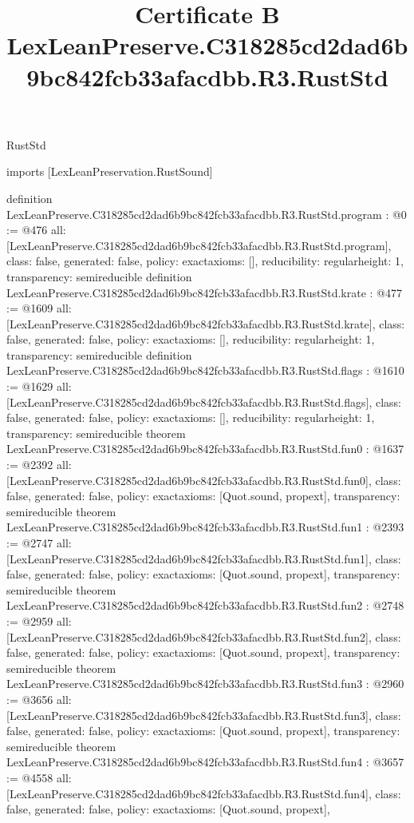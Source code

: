 \begin{lexlean}{RustStd}
\title{Certificate B LexLeanPreserve.C318285cd2dad6b9bc842fcb33afacdbb.R3.RustStd}
\begin{coremodule}
imports [LexLeanPreservation.RustSound]

definition LexLeanPreserve.C318285cd2dad6b9bc842fcb33afacdbb.R3.RustStd.program : @0 := @476 {
  all: [LexLeanPreserve.C318285cd2dad6b9bc842fcb33afacdbb.R3.RustStd.program],
  class: false,
  generated: false,
  policy: exact{axioms: []},
  reducibility: regular{height: 1},
  transparency: semireducible
}
definition LexLeanPreserve.C318285cd2dad6b9bc842fcb33afacdbb.R3.RustStd.krate : @477 := @1609 {
  all: [LexLeanPreserve.C318285cd2dad6b9bc842fcb33afacdbb.R3.RustStd.krate],
  class: false,
  generated: false,
  policy: exact{axioms: []},
  reducibility: regular{height: 1},
  transparency: semireducible
}
definition LexLeanPreserve.C318285cd2dad6b9bc842fcb33afacdbb.R3.RustStd.flags : @1610 := @1629 {
  all: [LexLeanPreserve.C318285cd2dad6b9bc842fcb33afacdbb.R3.RustStd.flags],
  class: false,
  generated: false,
  policy: exact{axioms: []},
  reducibility: regular{height: 1},
  transparency: semireducible
}
theorem LexLeanPreserve.C318285cd2dad6b9bc842fcb33afacdbb.R3.RustStd.fun0 : @1637 := @2392 {
  all: [LexLeanPreserve.C318285cd2dad6b9bc842fcb33afacdbb.R3.RustStd.fun0],
  class: false,
  generated: false,
  policy: exact{axioms: [Quot.sound, propext]},
  transparency: semireducible
}
theorem LexLeanPreserve.C318285cd2dad6b9bc842fcb33afacdbb.R3.RustStd.fun1 : @2393 := @2747 {
  all: [LexLeanPreserve.C318285cd2dad6b9bc842fcb33afacdbb.R3.RustStd.fun1],
  class: false,
  generated: false,
  policy: exact{axioms: [Quot.sound, propext]},
  transparency: semireducible
}
theorem LexLeanPreserve.C318285cd2dad6b9bc842fcb33afacdbb.R3.RustStd.fun2 : @2748 := @2959 {
  all: [LexLeanPreserve.C318285cd2dad6b9bc842fcb33afacdbb.R3.RustStd.fun2],
  class: false,
  generated: false,
  policy: exact{axioms: [Quot.sound, propext]},
  transparency: semireducible
}
theorem LexLeanPreserve.C318285cd2dad6b9bc842fcb33afacdbb.R3.RustStd.fun3 : @2960 := @3656 {
  all: [LexLeanPreserve.C318285cd2dad6b9bc842fcb33afacdbb.R3.RustStd.fun3],
  class: false,
  generated: false,
  policy: exact{axioms: [Quot.sound, propext]},
  transparency: semireducible
}
theorem LexLeanPreserve.C318285cd2dad6b9bc842fcb33afacdbb.R3.RustStd.fun4 : @3657 := @4558 {
  all: [LexLeanPreserve.C318285cd2dad6b9bc842fcb33afacdbb.R3.RustStd.fun4],
  class: false,
  generated: false,
  policy: exact{axioms: [Quot.sound, propext]},
}
\end{coremodule}
\end{lexlean}
